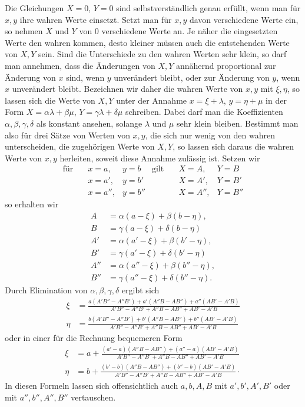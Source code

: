 Die Gleichungen $X=0$, $Y=0$ sind selbstverständlich genau erfüllt, wenn man für $x,y$ ihre wahren Werte einsetzt. Setzt man für $x,y$ davon verschiedene Werte ein, so nehmen $X$ und $Y$ von $0$ verschiedene Werte an. Je näher die eingesetzten Werte den wahren kommen, desto kleiner müssen auch die entstehenden Werte von $X,Y$ sein. Sind die Unterschiede zu den wahren Werten sehr klein, so darf man annehmen, dass die Änderungen von $X,Y$ annähernd proportional zur Änderung von $x$ sind, wenn $y$ unverändert bleibt, oder zur Änderung von $y$, wenn $x$ unverändert bleibt. Bezeichnen wir daher die wahren Werte von $x,y$ mit $\xi,\eta$, so lassen sich die Werte von $X,Y$ unter der Annahme $x=\xi+\lambda$, $y=\eta+\mu$ in der Form $X=\alpha\lambda+\beta\mu$, $Y=\gamma\lambda+\delta\mu$ schreiben. Dabei darf man die Koeffizienten $\alpha,\beta,\gamma,\delta$ als konstant ansehen, solange $\lambda$ und $\mu$ sehr klein bleiben. Bestimmt man also für drei Sätze von Werten von $x,y$, die sich nur wenig von den wahren unterscheiden, die zugehörigen Werte von $X,Y$, so lassen sich daraus die wahren Werte von $x,y$ herleiten, soweit diese Annahme zulässig ist. Setzen wir
\[
\begin{array}{rlllll}
\text{für}\quad & x=a, & y=b & \text{gilt}\quad & X=A, & Y=B\\
& x=a', & y=b' && X=A', & Y=B'\\
& x=a'', & y=b'' && X=A'', & Y=B''
\end{array}
\]
so erhalten wir
\[
\begin{aligned}
A&=\alpha(a-\xi)+\beta(b-\eta),\\
B&=\gamma(a-\xi)+\delta(b-\eta)\\
A'&=\alpha(a'-\xi)+\beta(b'-\eta),\\
B'&=\gamma(a'-\xi)+\delta(b'-\eta)\\
A''&=\alpha(a''-\xi)+\beta(b''-\eta),\\
B''&=\gamma(a''-\xi)+\delta(b''-\eta).
\end{aligned}
\]
Durch Elimination von $\alpha,\beta,\gamma,\delta$ ergibt sich
\[
\begin{aligned}
\xi&=\frac{a(A'B''-A''B')+a'(A''B-AB'')+a''(AB'-A'B)}{A'B''-A''B'+A''B-AB''+AB'-A'B}\\[6pt]
\eta&=\frac{b(A'B''-A''B')+b'(A''B-AB'')+b''(AB'-A'B)}{A'B''-A''B'+A''B-AB''+AB'-A'B}
\end{aligned}
\]
oder in einer für die Rechnung bequemeren Form
\[
\begin{aligned}
\xi&=a+\frac{(a'-a)(A''B-AB'')+(a''-a)(AB'-A'B)}{A'B''-A''B'+A''B-AB''+AB'-A'B}\\[6pt]
\eta&=b+\frac{(b'-b)(A''B-AB'')+(b''-b)(AB'-A'B)}{A'B''-A''B'+A''B-AB''+AB'-A'B}\mathpunct{\cdot}
\end{aligned}
\]
In diesen Formeln lassen sich offensichtlich auch $a,b,A,B$ mit $a',b',A',B'$ oder mit $a'',b'',A'',B''$ vertauschen.

